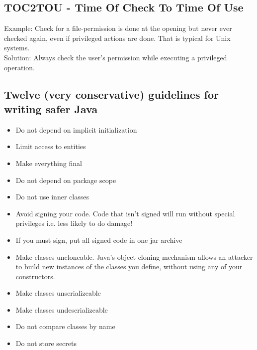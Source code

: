 \documentclass[10pt]{article}
\begin{document}
\subsection{TOC2TOU - Time Of Check To Time Of Use}
Example: Check for a file-permission is done at the opening but never ever checked again, even if privileged actions are done. That is typical for Unix systems.\\
Solution: Always check the user's permission while executing a privileged operation.
\subsection{Twelve (very conservative) guidelines for writing safer Java}
\begin{itemize}
	\item Do not depend on implicit initialization
	\item Limit access to entities
	\item Make everything final
	\item Do not depend on package scope
	\item Do not use inner classes
	\item Avoid signing your code. Code that isn't signed will run without special privileges i.e. less likely to do damage!
	\item If you must sign, put all signed code in one jar archive
	\item Make classes uncloneable. Java's object cloning mechanism allows an attacker to build new instances of the classes you define, without using any of your constructors.
	\item Make classes unserializeable
	\item Make classes undeserializeable
	\item Do not compare classes by name
	\item Do not store secrets
\end{itemize}
\end{document}
